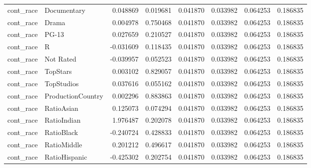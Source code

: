 \begin{tabular}{llrrrrrr}
cont_race & Documentary & 0.048869 & 0.019681 & 0.041870 & 0.033982 & 0.064253 & 0.186835 \\
cont_race & Drama & 0.004978 & 0.750468 & 0.041870 & 0.033982 & 0.064253 & 0.186835 \\
cont_race & PG-13 & 0.027659 & 0.210527 & 0.041870 & 0.033982 & 0.064253 & 0.186835 \\
cont_race & R & -0.031609 & 0.118435 & 0.041870 & 0.033982 & 0.064253 & 0.186835 \\
cont_race & Not Rated & -0.039957 & 0.052523 & 0.041870 & 0.033982 & 0.064253 & 0.186835 \\
cont_race & TopStars & 0.003102 & 0.829057 & 0.041870 & 0.033982 & 0.064253 & 0.186835 \\
cont_race & TopStudios & 0.037616 & 0.055162 & 0.041870 & 0.033982 & 0.064253 & 0.186835 \\
cont_race & ProductionCountry & 0.002296 & 0.883863 & 0.041870 & 0.033982 & 0.064253 & 0.186835 \\
cont_race & RatioAsian & 0.125073 & 0.074294 & 0.041870 & 0.033982 & 0.064253 & 0.186835 \\
cont_race & RatioIndian & 1.976487 & 0.202078 & 0.041870 & 0.033982 & 0.064253 & 0.186835 \\
cont_race & RatioBlack & -0.240724 & 0.428833 & 0.041870 & 0.033982 & 0.064253 & 0.186835 \\
cont_race & RatioMiddle & 0.201212 & 0.496617 & 0.041870 & 0.033982 & 0.064253 & 0.186835 \\
cont_race & RatioHispanic & -0.425302 & 0.202754 & 0.041870 & 0.033982 & 0.064253 & 0.186835 \\
\bottomrule
\end{tabular}
